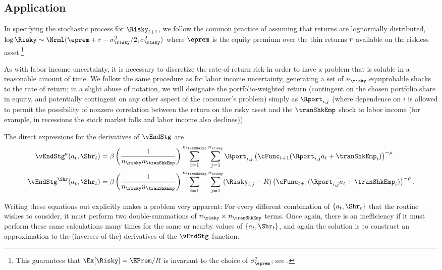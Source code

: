 \documentclass[SolvingMicroDSOPs]{subfiles}
\begin{document}
\subsection{Application}\label{subsec:MCApplication}

In specifying the stochastic process for $\Risky_{\prd+1}$, we follow the common practice of assuming that returns are lognormally distributed, $\log \Risky \sim \Nrml(\eprem+\rfree-\sigma^{2}_{\risky}/2,\sigma^{2}_{\risky})$ where $\eprem$ is the equity premium over the thin returns $r$ available on the riskless asset.\footnote{This guarantees that $\Ex[\Risky] = \EPrem/\Rfree$ is invariant to the choice of $\sigma^{2}_{\eprem}$; see .}

As with labor income uncertainty, it is necessary to discretize the rate-of-return risk in order to have a problem that is soluble in a reasonable amount of time.  We follow the same procedure as for labor income uncertainty, generating a set of $n_{\risky}$ equiprobable shocks to the rate of return; in a slight abuse of notation, we will designate the portfolio-weighted return (contingent on the chosen portfolio share in equity, and potentially contingent on any other aspect of the consumer's problem) simply as $\Rport_{i,j}$ (where dependence on $i$ is allowed to permit the possibility of nonzero correlation between the return on the risky asset and the $\tranShkEmp$ shock to labor income (for example, in recessions the stock market falls and labor income also declines)).

The direct expressions for the derivatives of $\vEndStg$ are
\begin{equation}\begin{gathered}\begin{aligned}
      \vEndStg^{a}(a_{\prd},\Shr_{\prd})  & = \DiscFac \left(\frac{1}{n_{\risky} n_{\tranShkEmp}}\right)\sum_{i=1}^{n_{\tranShkEmp}}\sum_{j=1}^{n_{\risky} }\Rport_{i,j} \left(\cFunc_{\prd+1}(\Rport_{i,j}a_{\prd}+\tranShkEmp_{i})\right)^{-\CRRA}
      \\      \vEndStg^{\Shr}(a_{\prd},\Shr_{\prd})  & = \DiscFac \left(\frac{1}{n_{\risky} n_{\tranShkEmp}}\right)\sum_{i=1}^{n_{\tranShkEmp}}\sum_{j=1}^{n_{\risky} }(\Risky_{i,j}-\Rfree)\left(\cFunc_{\prd+1}(\Rport_{i,j}a_{\prd}+\tranShkEmp_{i})\right)^{-\CRRA}.
    \end{aligned}\end{gathered}\end{equation}

Writing these equations out explicitly makes a problem very apparent: For every different combination of $\{{a}_{\prd},\Shr_{\prd}\}$ that the routine wishes to consider, it must perform two double-summations of $n_{\risky} \times n_{\tranShkEmp}$ terms.  Once again, there is an inefficiency if it must perform these same calculations many times for the same or nearby values of $\{{a}_{\prd},\Shr_{\prd}\}$, and again the solution is to construct an approximation to the (inverses of the) derivatives of the $\vEndStg$ function.
\end{document}
